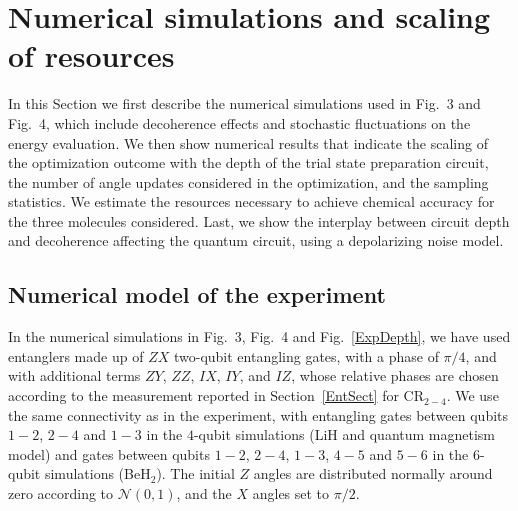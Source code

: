 \documentclass[twocolumn]{revtex4-1}
\newcommand{\1}{\mathbbm{1}}
\begin{document}
\section{Numerical simulations and scaling of resources\label{Scaling}}




In this Section we first describe the numerical simulations used in Fig.~3 and Fig.~4, which include decoherence effects and stochastic fluctuations on the energy evaluation. We then show numerical results that indicate the scaling of the optimization outcome with the depth of the trial state preparation circuit, the number of angle updates considered in the optimization, and the sampling statistics. We estimate the resources necessary to achieve chemical accuracy for the three molecules considered. Last, we show the interplay between circuit depth and decoherence affecting the quantum circuit, using a depolarizing noise model. 

\subsection{Numerical model of the experiment}
In the numerical simulations in Fig.~3, Fig.~4 and Fig.~\ref{ExpDepth}, we have used entanglers made up of $ZX$ two-qubit entangling gates, with a phase of $\pi/4$, and with additional terms $ZY$, $ZZ$, $IX$, $IY$, and $IZ$, whose relative phases are chosen according to the measurement reported in Section~\ref{EntSect} for CR$_{2-4}$. We use the same connectivity as in the experiment, with entangling gates between qubits $1-2$, $2-4$ and $1-3$ in the $4$-qubit simulations (LiH and quantum magnetism model) and gates between qubits $1-2$, $2-4$, $1-3$, $4-5$ and $5-6$ in the $6$-qubit simulations (BeH$_2$). The initial $Z$ angles are distributed normally around zero according to $\mathcal{N}(0,1)$, and the $X$ angles set to $\pi/2$. 
\end{document}
